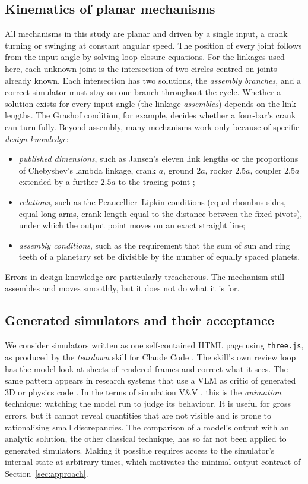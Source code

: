 \subsection{Kinematics of planar mechanisms}
All mechanisms in this study are planar and driven by a single input, a crank turning or swinging at constant angular speed. The position of every joint follows from the input angle by solving loop-closure equations. For the linkages used here, each unknown joint is the intersection of two circles centred on joints already known. Each intersection has two solutions, the \emph{assembly branches}, and a correct simulator must stay on one branch throughout the cycle. Whether a solution exists for every input angle (the linkage \emph{assembles}) depends on the link lengths. The Grashof condition, for example, decides whether a four-bar's crank can turn fully. Beyond assembly, many mechanisms work only because of specific \emph{design knowledge}:
\begin{itemize}
\item \emph{published dimensions}, such as Jansen's eleven link lengths \cite{jansen_strandbeest} or the proportions of Chebyshev's lambda linkage, crank $a$, ground $2a$, rocker $2.5a$, coupler $2.5a$ extended by a further $2.5a$ to the tracing point \cite{wiki_lambda};
\item \emph{relations}, such as the Peaucellier--Lipkin conditions (equal rhombus sides, equal long arms, crank length equal to the distance between the fixed pivots), under which the output point moves on an exact straight line;
\item \emph{assembly conditions}, such as the requirement that the sum of sun and ring teeth of a planetary set be divisible by the number of equally spaced planets.
\end{itemize}
Errors in design knowledge are particularly treacherous. The mechanism still assembles and moves smoothly, but it does not do what it is for.

\subsection{Generated simulators and their acceptance}
We consider simulators written as one self-contained HTML page using \texttt{three.js}, as produced by the \emph{teardown} skill for Claude Code \cite{teardown}. The skill's own review loop has the model look at sheets of rendered frames and correct what it sees. The same pattern appears in research systems that use a VLM as critic of generated 3D or physics code \cite{le2025articulate,alrashedy2025cad,shende2026perceptual,gao2026lam}. In the terms of simulation V\&V \cite{sargent2013vv,balci1997vva}, this is the \emph{animation} technique: watching the model run to judge its behaviour. It is useful for gross errors, but it cannot reveal quantities that are not visible and is prone to rationalising small discrepancies. The comparison of a model's output with an analytic solution, the other classical technique, has so far not been applied to generated simulators. Making it possible requires access to the simulator's internal state at arbitrary times, which motivates the minimal output contract of Section~\ref{sec:approach}.
